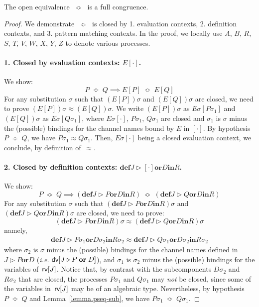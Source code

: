 \documentclass{LMCS}
\makeatletter
\newcommand{\resetequationcounter}{\setcounter{equation}{0}}
\newcommand{\ie}{\emph{i.e.}\@\xspace}
\newcommand{\kwd}[1]{\ensuremath{\mathbf{#1}}}
\newcommand{\prefix}[1]{\mathopen{}\mathrel{\kwd {#1}}}
\newcommand{\infix}[1]{\mathrel{\kwd {#1}}}
\renewcommand{\_}{\mathord{\rule[-.25ex]{1ex}{.15ex}}}
\newcommand{\dis}[2]{#1\infix{or}#2}
\newcommand{\define}[2]{\prefix{def} #1 \infix{in} #2}
\newcommand{\reaction}[2]{#1 \triangleright #2}
\newcommand{\wbc}{\mathrel{\approx}}
\newcommand{\pseq}{\;\mathop{\Bumpeq}\;}
\newcommand{\econtext}[1]{E[#1]}
\newcommand{\jctxt}[2][R]{\define{\dis{\reaction{J}{#2}}{D}}{#1}}
\newcommand{\dv}[1]{\mbox{\sf dv}[#1]}
\newcommand{\rv}[1]{\mbox{\sf rv}[#1]}
\makeatother
\begin{document}
\begin{thm}\label{th.pseq-cong}
  The open equivalence $\pseq$ is a full congruence.
\end{thm}
\resetequationcounter
\begin{proof}
  We demonstrate $\pseq$ is closed by 1. evaluation contexts, 2.
  definition contexts, and 3. pattern matching contexts.
  In the proof, we locally use $A$, $B$, $R$, $S$, $T$, $V$, $W$, $X$,
  $Y$, $Z$ to denote various processes.

  \paragraph{\bf 1. Closed by evaluation contexts:
    $\econtext{\cdot}$.}  We show: $$P \pseq Q \implies
  \econtext{P}\pseq \econtext{Q}$$ For any substitution $\sigma$ such
  that ${(\econtext{P})}{\sigma}$ and ${(\econtext{Q})}{\sigma}$ are
  closed, we need to prove ${(\econtext{P})}{\sigma} \wbc
  {(\econtext{Q})}{\sigma}$.  We write ${(\econtext{P})}{\sigma}$ as
  ${E}{\sigma}[{P}{\sigma_1}]$ and ${(\econtext{Q})}{\sigma}$ as
  ${E}{\sigma}[{Q}{\sigma_1}]$, where ${E}{\sigma}[\cdot]$,
  ${P}{\sigma_1}$, ${Q}{\sigma_1}$ are closed and $\sigma_1$ is
  $\sigma$ minus the (possible) bindings for the channel names bound
  by $E$ in $[\cdot]$. By hypothesis $P \pseq Q$, we have
  ${P}{\sigma_1} \wbc {Q}{\sigma_1}$.  Then, ${E}{\sigma}[\cdot]$
  being a closed evaluation context, we conclude, by definition
  of~$\wbc$.
  
  \paragraph{\bf 2. Closed by definition contexts: $\jctxt{[\cdot]}$.}
  We show: $$P \pseq Q \implies (\jctxt{P}) \pseq (\jctxt{Q})$$ For
  any substitution $\sigma$ such that ${(\jctxt{P})}{\sigma}$ and
  ${(\jctxt{Q})}{\sigma}$ are closed, we need to prove: $$
  {(\jctxt{P})}{\sigma} \wbc {(\jctxt{Q})}{\sigma} $$ namely,
  \begin{align}
    \define{\dis{\reaction{J}{{P}{\sigma_1}}}{{D}{\sigma_2}}}
    {{R}{\sigma_2}}
    \wbc
    \define{\dis{\reaction{J}{{Q}{\sigma_1}}}{{D}{\sigma_2}}}
    {{R}{\sigma_2}} \label{lb.joinpi.pseq-cong1}
  \end{align}
  where $\sigma_2$ is $\sigma$ minus the (possible) bindings for the
  channel names defined in $\dis{\reaction{J}{P}}{D}$ (\ie
  $\dv{\dis{\reaction{J}{P}}{D}}$), and $\sigma_1$ is $\sigma_2$ minus
  the (possible) bindings for the variables of~$\rv{J}$.  Notice that,
  by contrast with the subcomponents $D\sigma_2$ and~$R\sigma_2$ that
  are closed, the processes $P\sigma_1$ and $Q\sigma_1$ may \emph{not}
  be closed, since some of the variables in~$\rv{J}$ may be of an
  algebraic type.  Nevertheless, by hypothesis $P \pseq Q$ and
  Lemma~\ref{lemma.pseq-sub}, we have ${P}{\sigma_1} \pseq
  {Q}{\sigma_1}$.


\end{proof}
\end{document}
